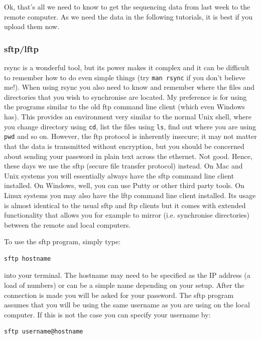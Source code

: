 \documentclass[11pt]{article}
\begin{document}
Ok, that's all we need to know to get the sequencing data from last
week to the remote computer. As we need the data in the following
tutorials, it is best if you upload them now.

\subsubsection{sftp/lftp}
\label{sec-2-2-2}
rsync is a wonderful tool, but its power makes it complex and it can be
difficult to remember how to do even simple things (try \texttt{man rsync} if
you don't believe me!). When using rsync you also need to know and
remember where the files and directories that you wish to synchronise
are located. My preference is for using
the programs similar to the old ftp command line client (which even Windows has). 
This provides an
environment very similar to the normal Unix shell, where you change
directory using \texttt{cd}, list the files using \texttt{ls}, find out where you are
using \texttt{pwd} and so on. However, the ftp protocol is inherently insecure;
it may not matter that the data is transmitted without encryption, but
you should be concerned about sending your password in plain text
across the ethernet. Not good. Hence, these days we use the sftp (secure
file transfer protocol) instead. On Mac and Unix systems you will
essentially always have the sftp command line client installed. On
Windows, well, you can use Putty or other third party tools. On Linux
systems you may also have the lftp command line client installed. Its
usage is almost identical to the usual sftp and ftp clients but it comes
with extended functionality that allows you for example to mirror (i.e.
synchronise directories) between the remote and local computers.

To use the sftp program, simply type:

\begin{verbatim}
sftp hostname
\end{verbatim}

into your terminal. The hostname may need to be specified as the IP
address (a load of numbers) or can be a simple name depending on your
setup. After the connection is made you will be asked for your password.
The sftp program assumes that you will be using the same username as you
are using on the local computer. If this is not the case you can specify
your username by:

\begin{verbatim}
sftp username@hostname
\end{verbatim}
\end{document}
